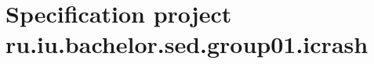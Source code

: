 \chapter{Specification project ru.iu.bachelor.sed.group01.icrash}

\label{chap:ru.iu.bachelor.sed.group01.icrash-ru.iu.bachelor.sed.group01.icrash}








